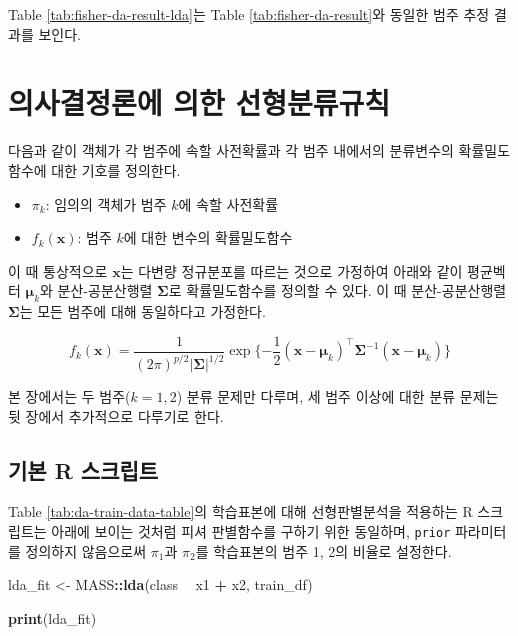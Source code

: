 \documentclass[]{book}
\newenvironment{Shaded}{\begin{snugshade}}{\end{snugshade}}
\newcommand{\KeywordTok}[1]{\textcolor[rgb]{0.13,0.29,0.53}{\textbf{#1}}}
\newcommand{\NormalTok}[1]{#1}
\newcommand{\OperatorTok}[1]{\textcolor[rgb]{0.81,0.36,0.00}{\textbf{#1}}}
\newcommand{\StringTok}[1]{\textcolor[rgb]{0.31,0.60,0.02}{#1}}
\providecommand{\tightlist}{%
  \setlength{\itemsep}{0pt}\setlength{\parskip}{0pt}}
\begin{document}
Table \ref{tab:fisher-da-result-lda}는 Table \ref{tab:fisher-da-result}와 동일한 범주 추정 결과를 보인다.

\hypertarget{lda}{%
\section{의사결정론에 의한 선형분류규칙}\label{lda}}

다음과 같이 객체가 각 범주에 속할 사전확률과 각 범주 내에서의 분류변수의 확률밀도함수에 대한 기호를 정의한다.

\begin{itemize}
\tightlist
\item
  \(\pi_k\): 임의의 객체가 범주 \(k\)에 속할 사전확률
\item
  \(f_k(\mathbf{x})\): 범주 \(k\)에 대한 변수의 확률밀도함수
\end{itemize}

이 때 통상적으로 \(\mathbf{x}\)는 다변량 정규분포를 따르는 것으로 가정하여 아래와 같이 평균벡터 \(\boldsymbol\mu_k\)와 분산-공분산행렬 \(\boldsymbol\Sigma\)로 확률밀도함수를 정의할 수 있다. 이 때 분산-공분산행렬 \(\boldsymbol\Sigma\)는 모든 범주에 대해 동일하다고 가정한다.

\begin{equation}
f_k(\mathbf{x}) = \frac{1}{(2\pi)^{p/2}|\boldsymbol\Sigma|^{1/2}} \exp \{ -\frac{1}{2} \left(\mathbf{x} - \boldsymbol\mu_k\right)^\top \boldsymbol\Sigma^{-1} \left(\mathbf{x} - \boldsymbol\mu_k\right) \}
\label{eq:mv-gaussian-dist}
\end{equation}

본 장에서는 두 범주(\(k = 1, 2\)) 분류 문제만 다루며, 세 범주 이상에 대한 분류 문제는 뒷 장에서 추가적으로 다루기로 한다.

\hypertarget{lda-basic-script}{%
\subsection{기본 R 스크립트}\label{lda-basic-script}}

Table \ref{tab:da-train-data-table}의 학습표본에 대해 선형판별분석을 적용하는 R 스크립트는 아래에 보이는 것처럼 피셔 판별함수를 구하기 위한 동일하며, \texttt{prior} 파라미터를 정의하지 않음으로써 \(\pi_1\)과 \(\pi_2\)를 학습표본의 범주 1, 2의 비율로 설정한다.

\begin{Shaded}
\begin{Highlighting}[]
\NormalTok{lda_fit <-}\StringTok{ }\NormalTok{MASS}\OperatorTok{::}\KeywordTok{lda}\NormalTok{(class }\OperatorTok{~}\StringTok{ }\NormalTok{x1 }\OperatorTok{+}\StringTok{ }\NormalTok{x2, train_df)}

\KeywordTok{print}\NormalTok{(lda_fit)}
\end{Highlighting}
\end{Shaded}
\end{document}

